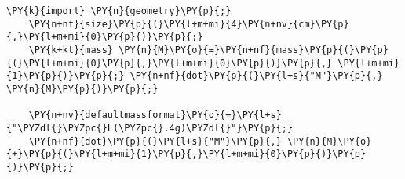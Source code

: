 \begin{Verbatim}[commandchars=\\\{\}]
    \PY{k}{import} \PY{n}{geometry}\PY{p}{;}
    \PY{n+nf}{size}\PY{p}{(}\PY{l+m+mi}{4}\PY{n+nv}{cm}\PY{p}{,}\PY{l+m+mi}{0}\PY{p}{)}\PY{p}{;}
    \PY{k+kt}{mass} \PY{n}{M}\PY{o}{=}\PY{n+nf}{mass}\PY{p}{(}\PY{p}{(}\PY{l+m+mi}{0}\PY{p}{,}\PY{l+m+mi}{0}\PY{p}{)}\PY{p}{,} \PY{l+m+mi}{1}\PY{p}{)}\PY{p}{;} \PY{n+nf}{dot}\PY{p}{(}\PY{l+s}{"M"}\PY{p}{,} \PY{n}{M}\PY{p}{)}\PY{p}{;}

    \PY{n+nv}{defaultmassformat}\PY{o}{=}\PY{l+s}{"\PYZdl{}\PYZpc{}L(\PYZpc{}.4g)\PYZdl{}"}\PY{p}{;}
    \PY{n+nf}{dot}\PY{p}{(}\PY{l+s}{"M"}\PY{p}{,} \PY{n}{M}\PY{o}{+}\PY{p}{(}\PY{l+m+mi}{1}\PY{p}{,}\PY{l+m+mi}{0}\PY{p}{)}\PY{p}{)}\PY{p}{;}
\end{Verbatim}
